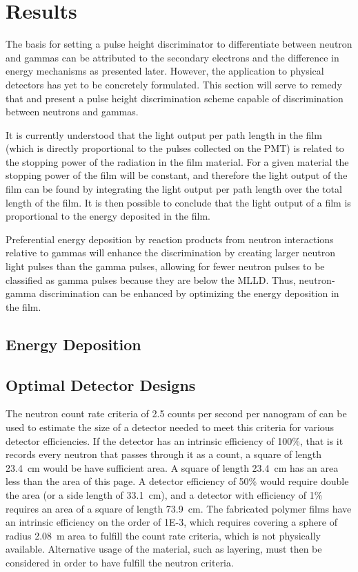 \chapter{Results}
\label{chap:results}

The basis for setting a pulse height discriminator to differentiate between neutron and gammas can be attributed to the secondary electrons and the difference in energy mechanisms as presented later.
However, the application to physical detectors has yet to be concretely formulated.
This section will serve to remedy that and present a pulse height discrimination scheme capable of discrimination between neutrons and gammas.

It is currently understood that the light output per path length in the film (which is directly proportional to the pulses collected on the PMT) is related to the stopping power of the radiation in the film material.
For a given material the stopping power of the film will be constant, and therefore the light output of the film can be found by integrating the light output per path length over the total length of the film.
It is then possible to conclude that the light output of a film is proportional to the energy deposited in the film.

Preferential energy deposition by reaction products from neutron interactions relative to gammas will enhance the discrimination by creating larger neutron light pulses than the gamma pulses, allowing for fewer neutron pulses to be classified as gamma pulses because they are below the MLLD.
Thus, neutron-gamma discrimination can be enhanced by optimizing the energy deposition in the film. 

\section{Energy Deposition}


\section{Optimal Detector Designs}

The neutron count rate criteria of 2.5 counts per second per nanogram of  can be used to estimate the size of a detector needed to meet this criteria for various detector efficiencies. 
If the detector has an intrinsic efficiency of 100\%, that is it records every neutron that passes through it as a count, a square of length \SI{23.4}{\cm} would be have sufficient area.
A square of length \SI{23.4}{\cm} has an area less than the area of this page.
A detector efficiency of 50\% would require double the area (or a side length of \SI{33.1}{\cm}), and a detector with efficiency of 1\% requires an area of a square of length \SI{73.9}{\cm}.
The fabricated polymer films have an intrinsic efficiency on the order of \num{1E-3}, which requires covering a sphere of radius \SI{2.08}{\m} area to fulfill the count rate criteria, which is not physically available.
Alternative usage of the material, such as layering, must then be considered in order to have fulfill the neutron criteria.

